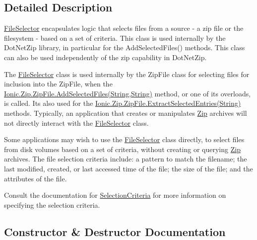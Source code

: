 \subsection{Detailed Description}
\mbox{\hyperlink{class_super_tiled2_unity_1_1_ionic_1_1_file_selector}{File\+Selector}} encapsulates logic that selects files from a source -\/ a zip file or the filesystem -\/ based on a set of criteria. This class is used internally by the Dot\+Net\+Zip library, in particular for the Add\+Selected\+Files() methods. This class can also be used independently of the zip capability in Dot\+Net\+Zip. 

The \mbox{\hyperlink{class_super_tiled2_unity_1_1_ionic_1_1_file_selector}{File\+Selector}} class is used internally by the Zip\+File class for selecting files for inclusion into the Zip\+File, when the \mbox{\hyperlink{class_super_tiled2_unity_1_1_ionic_1_1_zip_1_1_zip_file_ac40d1b5cde5fe68a968056fe0f401359}{Ionic.\+Zip.\+Zip\+File.\+Add\+Selected\+Files(\+String,\+String)}} method, or one of its overloads, is called. It\textquotesingle{}s also used for the \mbox{\hyperlink{class_super_tiled2_unity_1_1_ionic_1_1_zip_1_1_zip_file_a1c3f402c719453b86bec0438b649c5f4}{Ionic.\+Zip.\+Zip\+File.\+Extract\+Selected\+Entries(\+String)}} methods. Typically, an application that creates or manipulates \mbox{\hyperlink{namespace_super_tiled2_unity_1_1_ionic_1_1_zip}{Zip}} archives will not directly interact with the \mbox{\hyperlink{class_super_tiled2_unity_1_1_ionic_1_1_file_selector}{File\+Selector}} class. 

Some applications may wish to use the \mbox{\hyperlink{class_super_tiled2_unity_1_1_ionic_1_1_file_selector}{File\+Selector}} class directly, to select files from disk volumes based on a set of criteria, without creating or querying \mbox{\hyperlink{namespace_super_tiled2_unity_1_1_ionic_1_1_zip}{Zip}} archives. The file selection criteria include\+: a pattern to match the filename; the last modified, created, or last accessed time of the file; the size of the file; and the attributes of the file. 

Consult the documentation for \mbox{\hyperlink{class_super_tiled2_unity_1_1_ionic_1_1_file_selector_a0f2d26f8fb39862f504bc0069365ff39}{Selection\+Criteria}} for more information on specifying the selection criteria. 

\subsection{Constructor \& Destructor Documentation}
\mbox{\label{class_super_tiled2_unity_1_1_ionic_1_1_file_selector_af4eb6aa0e0d86c9af92a0dbea18ec673}} 
